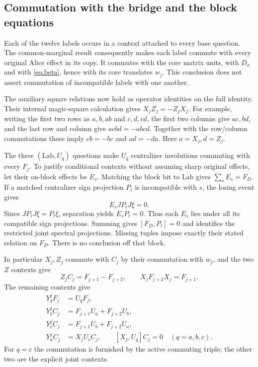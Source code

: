 \subsection{Commutation with the bridge and the block equations}
Each of the twelve labels occurs in a context attached to every base question. The common-marginal result consequently makes each label commute with every original Alice effect in its copy. It commutes with the core matrix units, with $D_x$ and with \eqref{eq:beta}, hence with its core translates $w_j$. This conclusion does not assert commutation of incompatible labels with one another.

The auxiliary square relations now hold as operator identities on the full identity. Their internal magic-square calculation gives $X_jZ_j=-Z_jX_j$. For example, writing the first two rows as $a,b,ab$ and $c,d,cd$, the first two columns give $ac,bd$, and the last row and column give $acbd=-abcd$. Together with the row/column commutations these imply $cb=-bc$ and $ad=-da$. Here $a=X_j,d=Z_j$.

The three $(\mathrm{Lab},U_q)$ questions make $U_q$ centralizer involutions commuting with every $F_j$. To justify conditional contexts without assuming sharp original effects, let their on-block effects be $E_s$. Matching the block bit to $\mathrm{Lab}$ gives $\sum_sE_s=F_D$. If a matched centralizer sign projection $P_t$ is incompatible with $s$, the losing event gives
\[
 E_sJP_tJ\xi=0.
\]
Since $JP_tJ\xi=P_t\xi$, separation yields $E_sP_t=0$. Thus each $E_s$ lies under all its compatible sign projections. Summing gives $[F_D,P_t]=0$ and identifies the restricted joint spectral projections. Missing tuples impose exactly their stated relation on $F_D$. There is no conclusion off that block.

In particular $X_j,Z_j$ commute with $C_j$ by their commutation with $w_j$, and the two $Z$ contexts give
\begin{equation}\label{eq:swap}
 Z_jC_j=F_{j+1}-F_{j+2},\qquad X_jF_{j+2}X_j=F_{j+1}.
\end{equation}
The remaining contexts give
\begin{equation}\label{eq:Yblocks}
\begin{aligned}
 Y_q^jF_j&=U_qF_j,\\
 Y_b^jC_j&=F_{j+1}U_a+F_{j+2}U_b,\\
 Y_c^jC_j&=F_{j+1}U_b+F_{j+2}U_a,\\
 Y_a^jC_j&=X_jU_cC_j,
 \qquad [X_j,U_q]C_j=0\quad(q=a,b,c).
\end{aligned}
\end{equation}
For $q=c$ the commutation is furnished by the active commuting triple; the other two are the explicit joint contexts.

